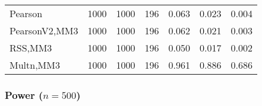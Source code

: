 \documentclass[
]{article}
\begin{document}
\begin{table}[H]
{\begin{tabular}[t]{lrrrrrr}
\hspace{1em}Pearson & 1000 & 1000 & 196 & 0.063 & 0.023 & 0.004\\
\hspace{1em}PearsonV2,MM3 & 1000 & 1000 & 196 & 0.062 & 0.021 & 0.003\\
\hspace{1em}RSS,MM3 & 1000 & 1000 & 196 & 0.050 & 0.017 & 0.002\\
\hspace{1em}Multn,MM3 & 1000 & 1000 & 196 & 0.961 & 0.886 & 0.686\\
\bottomrule
\end{tabular}}
\end{table}

\hypertarget{power-n500-2}{%
\subsubsection{\texorpdfstring{Power
(\(n=500\))}{Power (n=500)}}\label{power-n500-2}}
\end{document}

